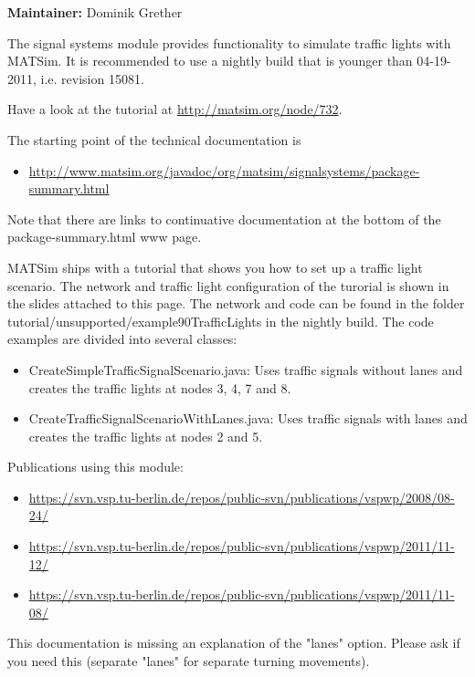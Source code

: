 \textbf{Maintainer:} Dominik Grether

The signal systems module provides functionality to simulate traffic  lights with MATSim. It is recommended to use a nightly build that is  younger than 04-19-2011, i.e. revision 15081.

Have a look at the tutorial at \href{http://matsim.org/node/732}{http://matsim.org/node/732}.

The starting point of the technical documentation is
\begin{itemize}
	\item \href{http://www.matsim.org/javadoc/org/matsim/signalsystems/package-summary.html}{http://www.matsim.org/javadoc/org/matsim/signalsystems/package-summary.html}
\end{itemize}

Note that there are links to continuative documentation at the bottom of the package-summary.html www page.

MATSim ships with a tutorial that shows you how to set up a traffic  light scenario. The network and traffic light configuration of the  turorial is shown in the slides attached to this page. The network and  code can be found in the folder  tutorial/unsupported/example90TrafficLights in the nightly build. The  code examples are divided into several classes:
\begin{itemize}
	\item CreateSimpleTrafficSignalScenario.java: Uses traffic signals  without lanes and creates the traffic lights at nodes 3, 4, 7 and 8.
	\item CreateTrafficSignalScenarioWithLanes.java: Uses traffic signals with lanes and creates the traffic lights at nodes 2 and 5.
\end{itemize}



Publications using this module:
\begin{itemize}
	\item \href{https://svn.vsp.tu-berlin.de/repos/public-svn/publications/vspwp/2008/08-24/}{https://svn.vsp.tu-berlin.de/repos/public-svn/publications/vspwp/2008/08-24/}
	\item \href{https://svn.vsp.tu-berlin.de/repos/public-svn/publications/vspwp/2011/11-12/}{https://svn.vsp.tu-berlin.de/repos/public-svn/publications/vspwp/2011/11-12/}
	\item \href{https://svn.vsp.tu-berlin.de/repos/public-svn/publications/vspwp/2011/11-08/}{https://svn.vsp.tu-berlin.de/repos/public-svn/publications/vspwp/2011/11-08/}
\end{itemize}This documentation is missing an  explanation of the "lanes" option. Please ask if you need this  (separate "lanes" for separate turning movements).




